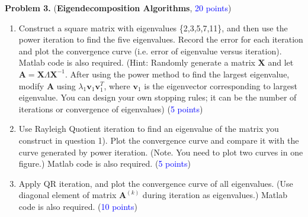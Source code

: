 \documentclass[english,onecolumn]{IEEEtran}
\newcommand{\0}{{\mathbf{0}}} %
\begin{document}
\newpage
\noindent \textbf{Problem 3.}  (\textbf{Eigendecomposition Algorithms}, \textcolor{blue}{20 points})
\begin{enumerate}
    \item     Construct a square matrix with eigenvalues \{2,3,5,7,11\}, and then use the power iteration to find the five eigenvalues. Record the error for each iteration and plot the convergence curve (i.e. error of eigenvalue versus iteration). Matlab code is also required. (Hint: Randomly generate a matrix $\textbf{X}$ and let $\textbf{A}=\textbf{X}\Lambda\textbf{X}^{-1}$. After using the power method to find the largest eigenvalue, modify $\textbf{A}$ using $\lambda_1\textbf{v}_1\textbf{v}_1^T$, where $\textbf{v}_1$ is the eigenvector corresponding to largest eigenvalue. You can design your own stopping rules; it can be the number of iterations or convergence of eigenvalues) (\textcolor{blue}{5 points})
    
    \item Use Rayleigh Quotient iteration to find an eigenvalue of the matrix you construct in question 1). Plot the convergence curve and compare it with the curve generated by power iteration. (Note. You need to plot two curves in one figure.) Matlab code is also required. (\textcolor{blue}{5 points})

    \item Apply QR iteration, and plot the convergence curve of all eigenvalues. (Use diagonal element of matrix $\textbf{A}^{(k)}$ during iteration as eigenvalues.) Matlab code is also required. (\textcolor{blue}{10 points})
\end{enumerate}
\end{document}
